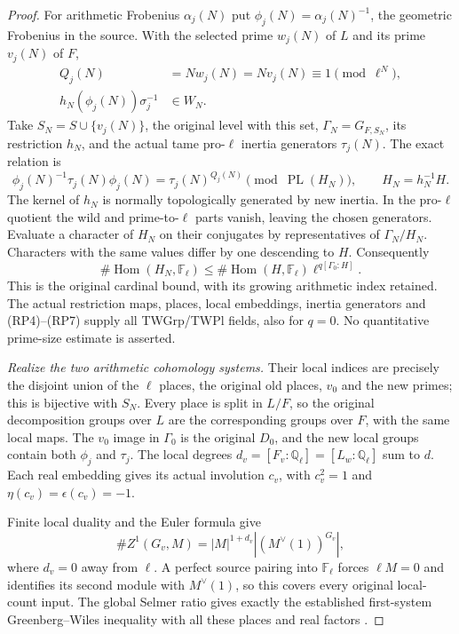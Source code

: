 \begin{proof}
For arithmetic Frobenius $\alpha_j(N)$ put
$\phi_j(N)=\alpha_j(N)^{-1}$, the geometric Frobenius in the source.
With the selected prime $w_j(N)$ of $L$ and its prime $v_j(N)$ of $F$,
\[
 \begin{split}
 Q_j(N)&=Nw_j(N)=Nv_j(N)\equiv1\pmod{\ell^N},\\
 h_N(\phi_j(N))\sigma_j^{-1}&\in W_N.
 \end{split}                                               \tag{RP5}
\]
Take $S_N=S\cup\{v_j(N)\}$, the original level with this set,
$\Gamma_N=G_{F,S_N}$, its restriction $h_N$, and the actual tame
pro-$\ell$ inertia generators $\tau_j(N)$.  The exact relation is
\[
 \phi_j(N)^{-1}\tau_j(N)\phi_j(N)=\tau_j(N)^{Q_j(N)}
                         \pmod{\operatorname{PL}(H_N)},
 \qquad H_N=h_N^{-1}H.                                    \tag{RP6}
\]
The kernel of $h_N$ is normally topologically generated by new inertia.
In the pro-$\ell$ quotient the wild and prime-to-$\ell$ parts vanish,
leaving the chosen generators.  Evaluate a character of $H_N$ on their
conjugates by representatives of $\Gamma_N/H_N$.  Characters with the
same values differ by one descending to $H$.  Consequently
\[
 \#\operatorname{Hom}(H_N,\mathbb F_\ell)
 \le \#\operatorname{Hom}(H,\mathbb F_\ell)
                      \ell^{q[\Gamma_0:H]}.                \tag{RP7}
\]
This is the original cardinal bound, with its growing arithmetic index
retained.  The actual restriction maps, places, local embeddings,
inertia generators and (RP4)--(RP7) supply all TWGrp/TWPl fields, also
for $q=0$.  No quantitative prime-size estimate is asserted.

\emph{Realize the two arithmetic cohomology systems.}
Their local indices are precisely the disjoint union of the $\ell$
places, the original old places, $v_0$ and the new primes; this is
bijective with $S_N$.  Every place is split in $L/F$, so the original
decomposition groups over $L$ are the corresponding groups over $F$,
with the same local maps.  The $v_0$ image in $\Gamma_0$ is the original
$D_0$, and the new local groups contain both $\phi_j$ and $\tau_j$.
The local degrees $d_v=[F_v:\mathbb Q_\ell]=[L_w:\mathbb Q_\ell]$
sum to $d$.  Each real embedding gives its actual involution $c_v$,
with $c_v^2=1$ and $\eta(c_v)=\epsilon(c_v)=-1$.

Finite local duality and the Euler formula give
\[
 \#Z^1(G_v,M)=|M|^{1+d_v}|(M^\vee(1))^{G_v}|,
\]
where $d_v=0$ away from $\ell$.  A perfect source pairing into
$\mathbb F_\ell$ forces $\ell M=0$ and identifies its second module
with $M^\vee(1)$, so this covers every original local-count input.
The global Selmer ratio gives exactly the established first-system
Greenberg--Wiles inequality with all these places and real factors
\cite[I.2.1, I.2.3, I.2.8, I.4.10, I.4.15, I.5.1]{SelmerArPropADT}.


\end{proof}

